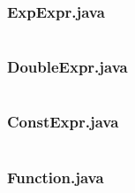 \subsubsection*{ExpExpr.java}
\inputminted{java}{tex/src/1/ExpExpr.java}

\subsubsection*{DoubleExpr.java}
\inputminted{java}{tex/src/1/DoubleExpr.java}

\subsubsection*{ConstExpr.java}
\inputminted{java}{tex/src/1/ConstExpr.java}

\subsubsection*{Function.java}
\inputminted{java}{tex/src/1/Function.java}
